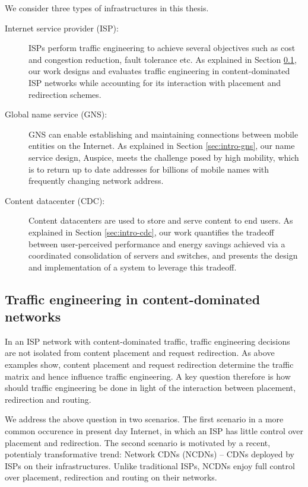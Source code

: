 We consider three types of infrastructures in this thesis.

\begin{description}
	\item[Internet service provider (ISP):] ISPs perform traffic engineering to achieve several objectives such as cost and congestion reduction, fault tolerance etc. As explained in Section \ref{sec:intro-te}, our work designs and evaluates traffic engineering in content-dominated ISP networks while accounting for its interaction with placement and redirection schemes. 
	\item[Global name service (GNS):] GNS can enable establishing and maintaining connections between mobile entities on the Internet. As explained in Section \ref{sec:intro-gns}, our name service design, Auspice, meets the challenge posed by high mobility, which is to return up to date addresses for billions of mobile names with frequently changing network address.
	\item[Content datacenter (CDC):] Content datacenters are used to store and serve content to end users. As explained in Section \ref{sec:intro-cdc}, our work quantifies the tradeoff between user-perceived performance and energy savings achieved via a coordinated consolidation of servers and switches, and presents the design and implementation of a system to leverage this tradeoff.
\end{description}

\subsection{Traffic engineering in content-dominated networks}
\label{sec:intro-te}
In an ISP network with content-dominated traffic, traffic engineering decisions are not isolated from content placement and request redirection. As above examples show, content placement and request redirection determine the traffic matrix and hence influence traffic engineering. A key question therefore is how should traffic engineering be done in light of the interaction between placement, redirection and routing.

We address the above question in two scenarios. The first scenario in a more common occurence in present day Internet, in which an ISP has little control over placement and redirection. The second scenario is motivated by a recent, potentialy transformative trend: Network CDNs (NCDNs) -- CDNs deployed by ISPs on their infrastructures. Unlike traditional ISPs, NCDNs enjoy full control over placement, redirection and routing on their networks.

